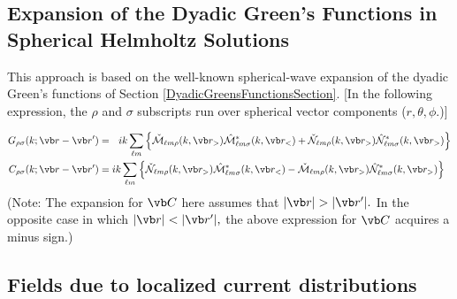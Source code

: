 \subsection*{Expansion of the Dyadic Green's Functions in Spherical Helmholtz Solutions}

This approach is based on the well-known spherical-wave expansion 
of the dyadic Green's functions of Section \ref{DyadicGreensFunctionsSection}.
[In the following expression, the $\rho$ and $\sigma$ subscripts run over
spherical vector components ($r,\theta,\phi$.)]

\begin{subequations}
\begin{align}
  G_{\rho\sigma} (k; \vb r-\vb r^\prime)
&=\hspace{0.09in} ik
  \sum_{\ell m} 
  \Big\{ 
     \MMExt_{\ell m \rho}( k, \vb r_>)
     \MMInt^*_{\ell m \sigma}( k, \vb r_<) 
   + \NNExt_{\ell m \rho}( k, \vb r_>)
     \NNInt^*_{\ell m \sigma}( k, \vb r_>) 
  \Big\}
\\
  C_{\rho\sigma} (k; \vb r-\vb r^\prime)
&=ik
  \sum_{\ell m} 
  \Big\{ 
     \NNExt_{\ell m \rho}( k, \vb r_>)
     \MMInt^*_{\ell m \sigma}( k, \vb r_<) 
   - \MMExt_{\ell m \rho}( k, \vb r_>)
     \NNInt^*_{\ell m \sigma}( k, \vb r_>) 
  \Big\}
\end{align}
\label{GCExpansions}
\end{subequations}
(Note: The expansion for $\vb C$ here assumes that 
$|\vb r|>|\vb r^\prime|.$ In the opposite case in 
which 
$|\vb r|<|\vb r^\prime|,$ the above expression for $\vb C$
acquires a minus sign.)

\subsection*{Fields due to localized current distributions}

